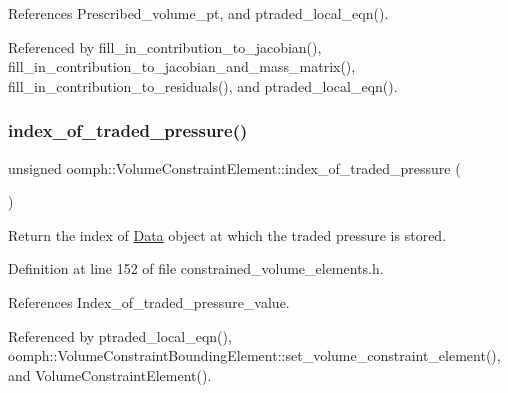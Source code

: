 References Prescribed\+\_\+volume\+\_\+pt, and ptraded\+\_\+local\+\_\+eqn().



Referenced by fill\+\_\+in\+\_\+contribution\+\_\+to\+\_\+jacobian(), fill\+\_\+in\+\_\+contribution\+\_\+to\+\_\+jacobian\+\_\+and\+\_\+mass\+\_\+matrix(), fill\+\_\+in\+\_\+contribution\+\_\+to\+\_\+residuals(), and ptraded\+\_\+local\+\_\+eqn().

\mbox{\label{classoomph_1_1VolumeConstraintElement_ada831157effca052df0fae723c21c426}} 
\subsubsection{\texorpdfstring{index\+\_\+of\+\_\+traded\+\_\+pressure()}{index\_of\_traded\_pressure()}}
{\footnotesize\ttfamily unsigned oomph\+::\+Volume\+Constraint\+Element\+::index\+\_\+of\+\_\+traded\+\_\+pressure (\begin{DoxyParamCaption}{ }\end{DoxyParamCaption})\hspace{0.3cm}{\ttfamily [inline]}}



Return the index of \hyperlink{classoomph_1_1Data}{Data} object at which the traded pressure is stored. 



Definition at line 152 of file constrained\+\_\+volume\+\_\+elements.\+h.



References Index\+\_\+of\+\_\+traded\+\_\+pressure\+\_\+value.



Referenced by ptraded\+\_\+local\+\_\+eqn(), oomph\+::\+Volume\+Constraint\+Bounding\+Element\+::set\+\_\+volume\+\_\+constraint\+\_\+element(), and Volume\+Constraint\+Element().

\mbox{\label{classoomph_1_1VolumeConstraintElement_aab138c0a3af1e72089d5bed31a633974}} 

